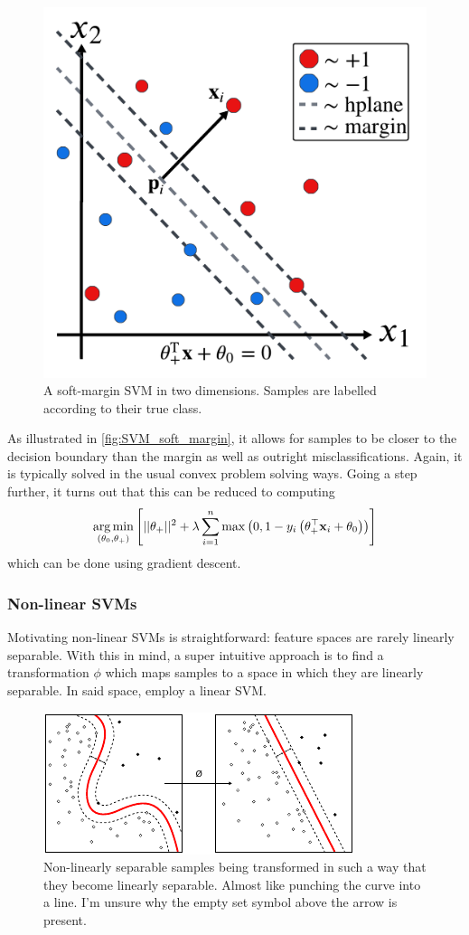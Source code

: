 \documentclass[11pt]{article}
\begin{document}
\begin{figure}[t]
    \centering
    \includegraphics[width=0.75\columnwidth]{./figures/supervised_learning/SVMs/SVM_soft_margin.pdf}
    \caption{A soft-margin SVM in two dimensions. Samples are labelled according to their true class.}
    \label{fig:SVM_soft_margin}
\end{figure}

\noindent As illustrated in \autoref{fig:SVM_soft_margin}, it allows for samples to be closer to the decision boundary than the margin as well as outright misclassifications. Again, it is typically solved in the usual convex problem solving ways. Going a step further, it turns out that this can be reduced to computing
$$
\operatorname*{arg\,min}_{(\theta_0,\theta_+)}\left[||\theta_+||^2+\lambda\sum_{i=1}^n\max\left(0,1-y_i\left(\theta_+^\top \mathbf{x}_i+\theta_0\right)\right)\right]
$$
which can be done using gradient descent.

\subsubsection{Non-linear SVMs}
Motivating non-linear SVMs is straightforward: feature spaces are rarely linearly separable. With this in mind, a super intuitive approach is to find a transformation $\phi$ which maps samples to a space in which they are linearly separable. In said space, employ a linear SVM. 

\begin{figure}[t]
    \centering
    \includegraphics[width=0.75\columnwidth]{./figures/supervised_learning/SVMs/SVM_non_linear.pdf}
    \caption{Non-linearly separable samples being transformed in such a way that they become linearly separable. Almost like punching the curve into a line. I'm unsure why the empty set symbol above the arrow is present. }
    \label{fig:SVM_non_linear}
\end{figure}
\end{document}
